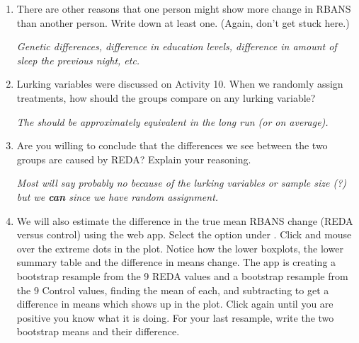 \begin{enumerate}
\begin{enumerate}
   \end{enumerate}

 \item  There are other reasons that one person might show more change
   in RBANS than another person.  Write down at least one. (Again,
   don't get stuck here.) 
\begin{students}
    \vspace{2.2cm}    
\end{students}

\begin{key}
  {\it   Genetic differences, difference in education levels, difference
     in amount of sleep the previous night, etc. 
}
\end{key}


 \item  Lurking variables were discussed on Activity 10.  When we
   randomly assign treatments, how should the groups compare on any
   lurking variable? 
\begin{students}
    \vspace{1.5cm}    
\end{students}

\begin{key}
  {\it  The should be approximately equivalent in the long run (or on average). }
\end{key}
   
 \item  Are you willing to conclude that the differences we see
   between the two groups are caused by REDA?  Explain
   your reasoning. 
\begin{students}
    \vspace{4cm}    
\end{students}

\begin{key}
  {\it  
   Most will say probably no because of the lurking variables or
   sample size (?) but we {\bf can} since we have random assignment.
 }
\end{key}
   \item We will also estimate the difference in the true
     mean RBANS change (REDA versus control) using the web app.  Select
     the  option under .
      Click  and mouse over the extreme dots in the plot.
       Notice how the lower boxplots, the lower summary table and the
       difference in means change.  The app is creating a  
       bootstrap resample from the 9 REDA values and a bootstrap
       resample from the 9 Control values, finding the mean of each,
       and subtracting to get a difference in means which shows up in
       the plot.  Click again until you are positive you know what it
       is doing. For your last  resample, write the two bootstrap
       means and their difference. 
\begin{students}
    \vspace{2cm}    
\end{students}


\end{enumerate}
